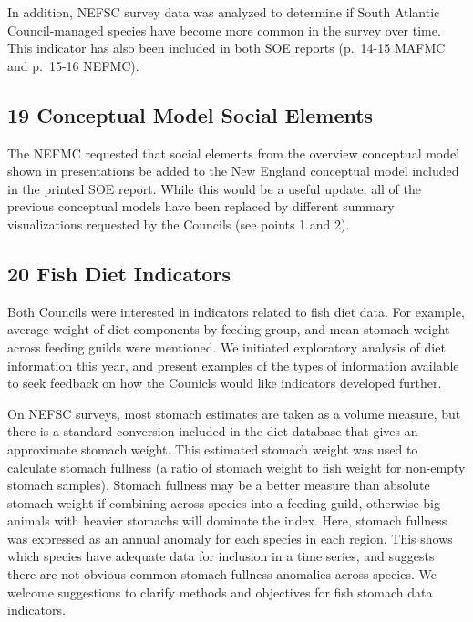 \documentclass[
  10pt,
]{article}
\begin{document}
In addition, NEFSC survey data was analyzed to determine if South
Atlantic Council-managed species have become more common in the survey
over time. This indicator has also been included in both SOE reports
(p.~14-15 MAFMC and p.~15-16 NEFMC).

\hypertarget{conceptual-model-social-elements}{%
\subsection{19 Conceptual Model Social
Elements}\label{conceptual-model-social-elements}}

The NEFMC requested that social elements from the overview conceptual
model shown in presentations be added to the New England conceptual
model included in the printed SOE report. While this would be a useful
update, all of the previous conceptual models have been replaced by
different summary visualizations requested by the Councils (see points 1
and 2).

\hypertarget{fish-diet-indicators}{%
\subsection{20 Fish Diet Indicators}\label{fish-diet-indicators}}

Both Councils were interested in indicators related to fish diet data.
For example, average weight of diet components by feeding group, and
mean stomach weight across feeding guilds were mentioned. We initiated
exploratory analysis of diet information this year, and present examples
of the types of information available to seek feedback on how the
Counicls would like indicators developed further.

On NEFSC surveys, most stomach estimates are taken as a volume measure,
but there is a standard conversion included in the diet database that
gives an approximate stomach weight. This estimated stomach weight was
used to calculate stomach fullness (a ratio of stomach weight to fish
weight for non-empty stomach samples). Stomach fullness may be a better
measure than absolute stomach weight if combining across species into a
feeding guild, otherwise big animals with heavier stomachs will dominate
the index. Here, stomach fullness was expressed as an annual anomaly for
each species in each region. This shows which species have adequate data
for inclusion in a time series, and suggests there are not obvious
common stomach fullness anomalies across species. We welcome suggestions
to clarify methods and objectives for fish stomach data indicators.
\end{document}
